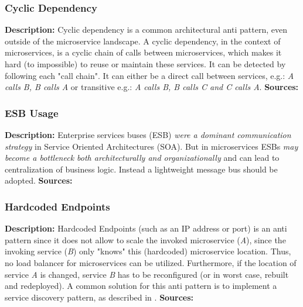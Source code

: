 \documentclass{article}
\begin{document}
\subsubsection{Cyclic Dependency}
\noindent\textbf{Description:} Cyclic dependency is a common architectural anti pattern, even outside of the microservice landscape. A cyclic dependency, in the context of microservices, is a cyclic chain of calls between microservices, which makes it hard (to impossible) to reuse or maintain these services. It can be detected by following each "call chain". It can either be a direct call between services, e.g.: \textit{A calls B, B calls A} or transitive e.g.: \textit{A calls B, B calls C and C calls A}. \newline
\noindent\textbf{Sources:} \cite{
    taibi_definition_2018,
    taibi_microservices_2020,
    bogner_towards_2019}
    
\subsubsection{ESB Usage}
\noindent\textbf{Description:} Enterprise services buses (ESB) \textit{were a dominant communication strategy} \cite{bandeira_we_2019} in Service Oriented Architectures (SOA). But in microservices ESBs \textit{may become a bottleneck both architecturally and organizationally} \cite{pautasso_microservices_2017} and can lead to centralization of business logic. Instead a lightweight message bus should be adopted.\newline
\noindent\textbf{Sources:} \cite{
    taibi_definition_2018,
    taibi_microservices_2020,
    neri_design_2019,
    bandeira_we_2019}
    
\subsubsection{Hardcoded Endpoints}
\noindent\textbf{Description:} Hardcoded Endpoints (such as an IP address or port) is an anti pattern since it does not allow to scale the invoked microservice (\textit{A}), since the invoking service (\textit{B}) only "knows" this (hardcoded) microservice location. Thus, no load balancer for microservices can be utilized. Furthermore, if the location of service \textit{A} is changed, service \textit{B} has to be reconfigured (or in worst case, rebuilt and redeployed). A common solution for this anti pattern is to implement a service discovery pattern, as described in  \cite{taibi_architectural_2018}.\newline
\noindent\textbf{Sources:} \cite{
    taibi_definition_2018,
    taibi_microservices_2020,
    neri_design_2019,
    bogner_towards_2019}
    
\end{document}
